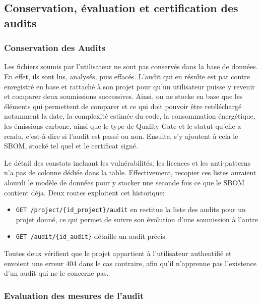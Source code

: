 \documentclass[a4paper,12pt]{article}
\providecommand{\tightlist}{\setlength{\itemsep}{0pt}\setlength{\parskip}{0pt}}
\providecommand{\tightlist}{}
\begin{document}
\subsection{Conservation, évaluation et certification des
audits}\label{conservation-uxe9valuation-et-certification-des-audits}

\subsubsection{Conservation des Audits}\label{conservation-des-audits}

Les fichiers soumis par l'utilisateur ne sont pas conservés dans la base
de données. En effet, ils sont lus, analysés, puis effacés. L'audit qui
en résulte est par contre enregistré en base et rattaché à son projet
pour qu'un utilisateur puisse y revenir et comparer deux soumissions
successives. Ainsi, on ne stocke en base que les éléments qui permettent
de comparer et ce qui doit pouvoir être retéléchargé notamment la date,
la complexité estimée du code, la consommation énergétique, les
émissions carbone, ainsi que le type de Quality Gate et le statut
qu'elle a rendu, c'est-à-dire si l'audit est passé ou non. Ensuite, s'y
ajoutent à cela le SBOM, stocké tel quel et le certificat signé.

Le détail des constats incluant les vulnérabilités, les licences et les
anti-patterns n'a pas de colonne dédiée dans la table. Effectivement,
recopier ces listes auraient alourdi le modèle de données pour y stocker
une seconde fois ce que le SBOM contient déja. Deux routes exploitent
cet historique:

\begin{itemize}
\tightlist
\item
  \texttt{GET\ /project/\{id\_project\}/audit} en restitue la liste des
  audits pour un projet donné, ce qui permet de suivre son évolution
  d'une soumission à l'autre
\item
  \texttt{GET\ /audit/\{id\_audit\}} détaille un audit précis.
\end{itemize}

Toutes deux vérifient que le projet appartient à l'utilisateur
authentifié et envoient une erreur 404 dans le cas contraire, afin qu'il
n'apprenne pas l'existence d'un audit qui ne le concerne pas.

\subsubsection{Evaluation des mesures de
l'audit}\label{evaluation-des-mesures-de-laudit}
\end{document}
